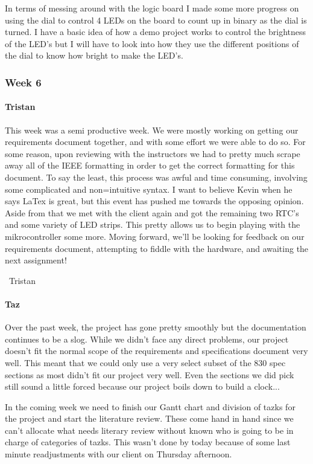 \documentclass[onecolumn, draftclsnofoot,10pt, compsoc]{IEEEtran}
\begin{document}
In terms of messing around with the logic board I made some more progress on using the dial to control 4 LEDs on the board to count up in binary as the dial is turned. I have a basic idea of how a demo project works to control the brightness of the LED's but I will have to look into how they use the different positions of the dial to know how bright to make the LED's.
\subsubsection{Week 6}
\paragraph{Tristan}
This week was a semi productive week. We were mostly working on getting our requirements document together, and with some effort we were able to do so. For some reason, upon reviewing with the instructors we had to pretty much scrape away all of the IEEE formatting in order to get the correct formatting for this document. To say the least, this process was awful and time consuming, involving some complicated and non=intuitive syntax. I want to believe Kevin when he says LaTex is great, but this event has pushed me towards the opposing opinion. Aside from that we met with the client again and got the remaining two RTC's and some variety of LED strips. This pretty allows us to begin playing with the mikrocontroller some more. Moving forward, we'll be looking for feedback on our requirements document, attempting to fiddle with the hardware, and awaiting the next assignment!

~Tristan
\paragraph{Taz}
Over the past week, the project has gone pretty smoothly but the documentation continues to be a slog. While we didn't face any direct problems, our project doesn't fit the normal scope of the requirements and specifications document very well. This meant that we could only use a very select subset of the 830 spec sections as most didn't fit our project very well. Even the sections we did pick still sound a little forced because our project boils down to build a clock...

In the coming week we need to finish our Gantt chart and division of tazks for the project and start the literature review. These come hand in hand since we can't allocate what needs literary review without known who is going to be in charge of categories of tazks. This wasn't done by today because of some last minute readjustments with our client on Thursday afternoon.
\end{document}
